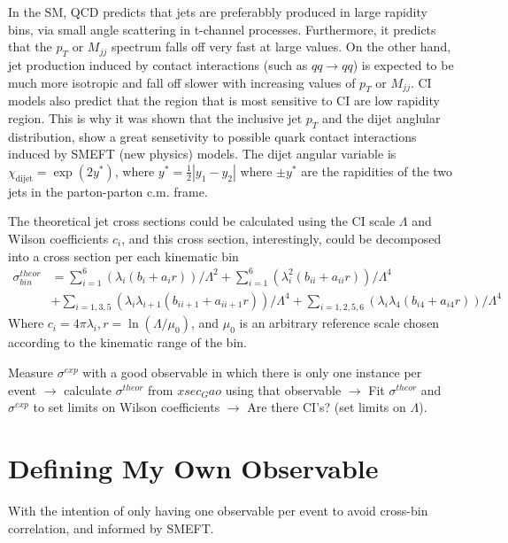 In the SM, QCD predicts that jets are preferabbly produced in large rapidity bins, via small angle scattering in t-channel processes. Furthermore, it predicts that the $p_T$ or $M_{jj}$ spectrum falls off very fast at large values. On the other hand, jet production induced by contact interactions (such as $qq \rightarrow qq$) is expected to be much more isotropic and fall off slower with increasing values of $p_T$ or $M_{jj}$. CI models also predict that the region that is most sensitive to CI are low rapidity region. This is why it was shown that the inclusive jet $p_T$ and the dijet anglular distribution, show a great sensetivity to possible quark contact interactions induced by SMEFT (new physics) models. The dijet angular variable is $\chi_{\mathrm{dijet}}=\exp \left(2 y^{*}\right)$, where $y^{*}=\frac{1}{2}\left|y_{1}-y_{2}\right|$ where $\pm y^{*}$ are the rapidities of the two jets in the parton-parton c.m. frame.



The theoretical jet cross sections could be calculated using the CI scale $\Lambda$ and Wilson coefficients $c_i$, and this cross section, interestingly, could be decomposed into a cross section per each kinematic bin %
\begin{equation}
\begin{aligned}
    \sigma_{b i n}^{theor} &=\sum_{i=1}^{6}\left(\lambda_{i}\left(b_{i}+a_{i} r\right)\right) / \Lambda^{2} +\sum_{i=1}^{6}\left(\lambda_{i}^{2}\left(b_{i i}+a_{i i} r\right)\right) / \Lambda^{4} \\
    &+ \sum_{i=1,3,5}\left(\lambda_{i} \lambda_{i+1}\left(b_{i i+1}+a_{i i+1} r\right)\right) / \Lambda^{4}  +\sum_{i=1,2,5,6}\left(\lambda_{i} \lambda_{4}\left(b_{i 4}+a_{i 4} r\right)\right) / \Lambda^{4}
    \label{xsec_Gao}
\end{aligned}
\end{equation}
Where $c_{i}=4 \pi \lambda_{i}, r=\ln \left(\Lambda / \mu_{0}\right)$, and $\mu_0$ is an arbitrary reference scale chosen according to the kinematic range of the bin. 


Measure $\sigma^{exp}$ with a good observable in which there is only one instance per event $\rightarrow$ calculate  $\sigma^{theor}$ from $xsec_Gao$ using that observable $\rightarrow$ Fit $\sigma^{theor}$ and $\sigma^{exp}$ to set limits on Wilson coefficients $\rightarrow$ Are there CI's? (set limits on $\Lambda$).









\section{Defining My Own Observable}
With the intention of only having one observable per event to avoid cross-bin correlation, and informed by SMEFT.


